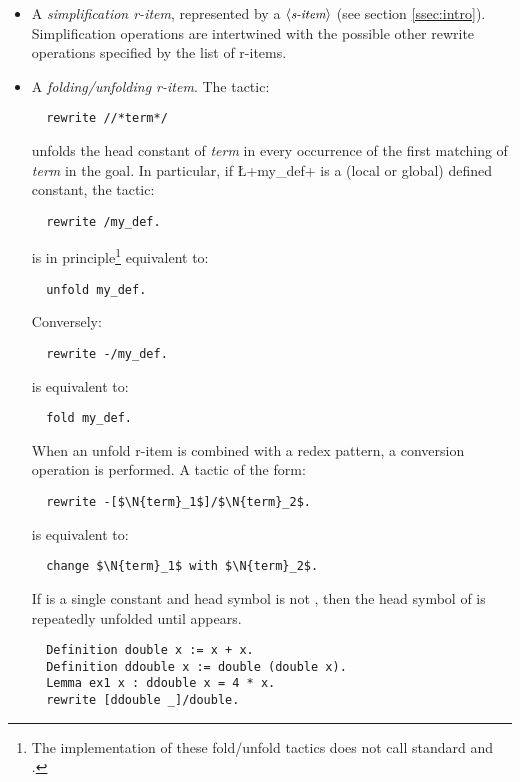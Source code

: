 \begin{itemize}
\item A \emph{simplification r-item}, represented by a
  $\langle\mbox{\itshape\rmfamily\small s-item}\rangle$ (see section \ref{ssec:intro}).
  Simplification operations are
  intertwined with the possible other rewrite operations specified by
  the list of r-items.
\item A \emph{folding/unfolding r-item}. The tactic:
\begin{lstlisting}
  rewrite //*term*/
\end{lstlisting}
unfolds the head constant of \textit{term} in every occurrence of the
first matching of \textit{term} in the goal. In particular, if
\L+my_def+ is a (local or global) defined constant, the tactic:
\begin{lstlisting}
  rewrite /my_def.
\end{lstlisting}
is in principle\footnote{The implementation of these fold/unfold tactics does
  not call standard \Coq{}  and .} equivalent to:
\begin{lstlisting}
  unfold my_def.
\end{lstlisting}
Conversely:
\begin{lstlisting}
  rewrite -/my_def.
\end{lstlisting}
is equivalent to:
\begin{lstlisting}
  fold my_def.
\end{lstlisting}

When an unfold r-item is combined with a redex pattern, a conversion
operation is performed. A tactic of the form:
\begin{lstlisting}
  rewrite -[$\N{term}_1$]/$\N{term}_2$.
\end{lstlisting}
is equivalent to:
\begin{lstlisting}
  change $\N{term}_1$ with $\N{term}_2$.
\end{lstlisting}

If  is a single constant and  head symbol
is not , then the head symbol of  is 
repeatedly unfolded until  appears.

\begin{lstlisting}
  Definition double x := x + x.
  Definition ddouble x := double (double x).
  Lemma ex1 x : ddouble x = 4 * x.
  rewrite [ddouble _]/double. 
\end{lstlisting}


\end{itemize}
